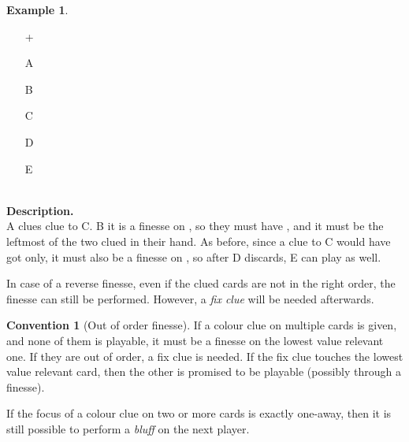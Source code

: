 \documentclass[a4paper]{article}
\theoremstyle{plain}
\theoremstyle{definition}
\newtheorem{example}[theorem]{Example}
\newtheorem{convention}[theorem]{Convention}
\begin{document}
\begin{example}	\hfill \\
	\begin{minipage}{0.45\textwidth}
		\begin{itemize}
			\item[\Large +]      
			\item[\Large A]    
			\item[\Large B]    
			\item[\Large C]    
			\item[\Large D]    
			\item[\Large E]    
		\end{itemize}
	\end{minipage}%
	\begin{minipage}{0.55\textwidth}
		\hfill \\
		
		\textbf{Description.} \\
		
		A clues  clue to C. B it is a finesse on , so they must have , and it must be the leftmost of the two clued  in their hand. As before, since a  clue to C would have got  only, it must also be a finesse on , so after D discards, E can play as well.
	\end{minipage}
\end{example} \vspace{0.15 cm}

In case of a reverse finesse, even if the clued cards are not in the right order, the finesse can still be performed. However, a \emph{fix clue} will be needed afterwards.

\begin{convention}[Out of order finesse]
	If a colour clue on multiple cards is given, and none of them is playable, it must be a finesse on the lowest value relevant one. If they are out of order, a fix clue is needed. If the fix clue touches the lowest value relevant card, then the other is promised to be playable (possibly through a finesse).
\end{convention}

If the focus of a colour clue on two or more cards is exactly one-away, then it is still possible to perform a \emph{bluff} on the next player.
\end{document}
